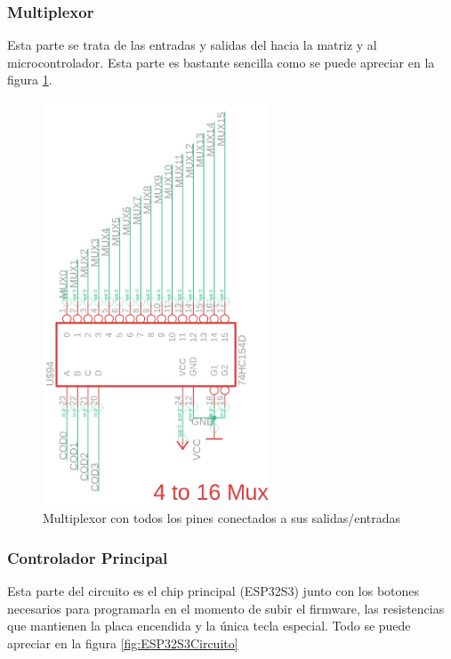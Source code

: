 \newpage
\subsubsection{\gls{Multiplexor}}
Esta parte se trata de las entradas y salidas del  hacia la matriz y al microcontrolador. Esta parte es bastante sencilla como se puede apreciar en la figura \ref{fig:MuxImagenCircuito}.

\begin{figure}[H]
    \centering
    \includegraphics[width=0.6\textwidth]{imagenes/Capitulos/Cap04/Mux.png}
    \caption{\gls{Multiplexor} con todos los pines conectados a sus salidas/entradas}
    \label{fig:MuxImagenCircuito}
\end{figure}

\newpage
\subsubsection{Controlador Principal}
Esta parte del circuito es el chip principal (ESP32S3) junto con los botones necesarios para programarla en el momento de subir el firmware, las resistencias que mantienen la placa encendida y la única tecla especial. Todo se puede apreciar en la figura \ref{fig:ESP32S3Circuito}

